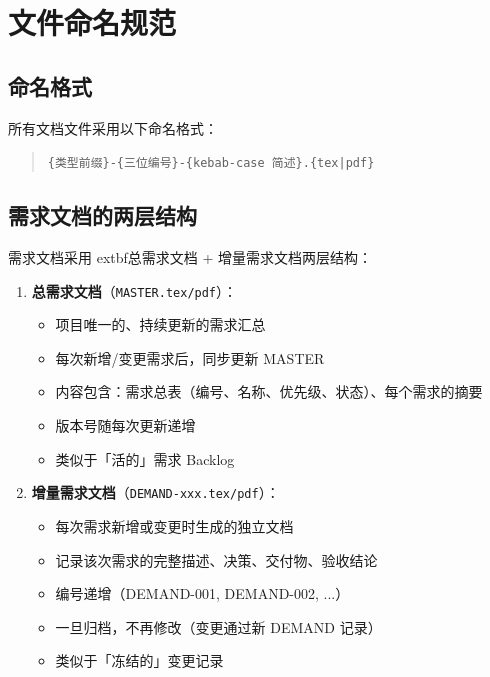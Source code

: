 \documentclass[11pt,a4paper]{article}
\begin{document}
\section{文件命名规范}

\subsection{命名格式}

所有文档文件采用以下命名格式：

\begin{quote}
\texttt{\{类型前缀\}-\{三位编号\}-\{kebab-case 简述\}.\{tex|pdf\}}
\end{quote}

\subsection{需求文档的两层结构}

需求文档采用	extbf{总需求文档 + 增量需求文档}两层结构：

\begin{enumerate}
  \item \textbf{总需求文档}（\texttt{MASTER.tex/pdf}）：
    \begin{itemize}[nosep]
      \item 项目唯一的、持续更新的需求汇总
      \item 每次新增/变更需求后，同步更新 MASTER
      \item 内容包含：需求总表（编号、名称、优先级、状态）、每个需求的摘要
      \item 版本号随每次更新递增
      \item 类似于「活的」需求 Backlog
    \end{itemize}
  \item \textbf{增量需求文档}（\texttt{DEMAND-xxx.tex/pdf}）：
    \begin{itemize}[nosep]
      \item 每次需求新增或变更时生成的独立文档
      \item 记录该次需求的完整描述、决策、交付物、验收结论
      \item 编号递增（DEMAND-001, DEMAND-002, ...）
      \item 一旦归档，不再修改（变更通过新 DEMAND 记录）
      \item 类似于「冻结的」变更记录
    \end{itemize}
\end{enumerate}
\end{document}
